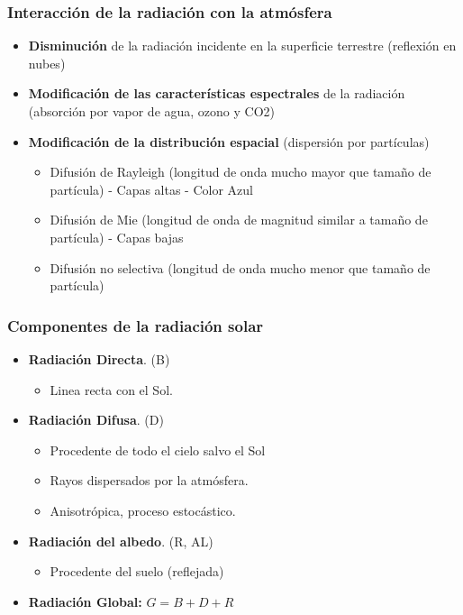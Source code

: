\documentclass[serif, xcolor=dvipsnames]{beamer}
\begin{document}
\begin{frame}
\frametitle{Interacción de la radiación con la atmósfera}
\begin{itemize}
\item \textbf{Disminución} de la radiación incidente en la superficie terrestre
(reflexión en nubes)
\item \textbf{Modificación de las características espectrales} de la radiación
(absorción por vapor de agua, ozono y CO2)
\item \textbf{Modificación de la distribución espacial} (dispersión por
partículas)

\begin{itemize}
\item Difusión de Rayleigh (longitud de onda mucho mayor que tamaño de partícula)
- Capas altas - Color Azul
\item Difusión de Mie (longitud de onda de magnitud similar a tamaño de
partícula) - Capas bajas
\item Difusión no selectiva (longitud de onda mucho menor que tamaño de
partícula)
\end{itemize}
\end{itemize}

\end{frame}
\begin{frame}
\frametitle{Componentes de la radiación solar}
\begin{itemize}
\item \textbf{Radiación Directa}. (B)

\begin{itemize}
\item Linea recta con el Sol.
\end{itemize}
\item \textbf{Radiación Difusa}. (D)

\begin{itemize}
\item Procedente de todo el cielo salvo el Sol
\item Rayos dispersados por la atmósfera. 
\item Anisotrópica, proceso estocástico.
\end{itemize}
\item \textbf{Radiación del albedo}. (R, AL)

\begin{itemize}
\item Procedente del suelo (reflejada)
\end{itemize}
\item \textbf{Radiación Global:} $G=B+D+R$
\end{itemize}

\end{frame}
\end{document}
